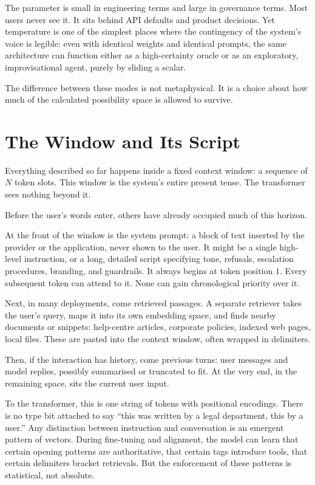 \documentclass[12pt,a4paper]{article}
\begin{document}
The parameter is small in engineering terms and large in governance terms. Most users never see it. It sits behind API defaults and product decisions. Yet temperature is one of the simplest places where the contingency of the system's voice is legible: even with identical weights and identical prompts, the same architecture can function either as a high-certainty oracle or as an exploratory, improvisational agent, purely by sliding a scalar.

The difference between these modes is not metaphysical. It is a choice about how much of the calculated possibility space is allowed to survive.

\section{The Window and Its Script}

Everything described so far happens inside a fixed context window: a sequence of $N$ token slots. This window is the system's entire present tense. The transformer sees nothing beyond it.

Before the user's words enter, others have already occupied much of this horizon.

At the front of the window is the system prompt: a block of text inserted by the provider or the application, never shown to the user. It might be a single high-level instruction, or a long, detailed script specifying tone, refusals, escalation procedures, branding, and guardrails. It always begins at token position $1$. Every subsequent token can attend to it. None can gain chronological priority over it.

Next, in many deployments, come retrieved passages. A separate retriever takes the user's query, maps it into its own embedding space, and finds nearby documents or snippets: help-centre articles, corporate policies, indexed web pages, local files. These are pasted into the context window, often wrapped in delimiters.

Then, if the interaction has history, come previous turns: user messages and model replies, possibly summarised or truncated to fit. At the very end, in the remaining space, sits the current user input.

To the transformer, this is one string of tokens with positional encodings. There is no type bit attached to say ``this was written by a legal department, this by a user.'' Any distinction between instruction and conversation is an emergent pattern of vectors. During fine-tuning and alignment, the model can learn that certain opening patterns are authoritative, that certain tags introduce tools, that certain delimiters bracket retrievals. But the enforcement of these patterns is statistical, not absolute.
\end{document}
